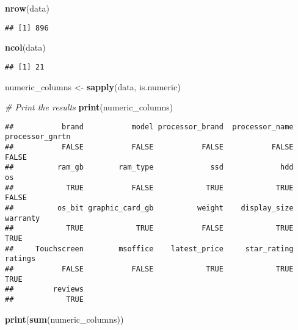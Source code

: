 \documentclass[
]{article}
\newenvironment{Shaded}{\begin{snugshade}}{\end{snugshade}}
\newcommand{\CommentTok}[1]{\textcolor[rgb]{0.56,0.35,0.01}{\textit{#1}}}
\newcommand{\FunctionTok}[1]{\textcolor[rgb]{0.13,0.29,0.53}{\textbf{#1}}}
\newcommand{\NormalTok}[1]{#1}
\newcommand{\OtherTok}[1]{\textcolor[rgb]{0.56,0.35,0.01}{#1}}
\begin{document}
\begin{Shaded}
\begin{Highlighting}[]
\FunctionTok{nrow}\NormalTok{(data)}
\end{Highlighting}
\end{Shaded}

\begin{verbatim}
## [1] 896
\end{verbatim}

\begin{Shaded}
\begin{Highlighting}[]
\FunctionTok{ncol}\NormalTok{(data)}
\end{Highlighting}
\end{Shaded}

\begin{verbatim}
## [1] 21
\end{verbatim}

\begin{Shaded}
\begin{Highlighting}[]
\NormalTok{numeric\_columns }\OtherTok{\textless{}{-}} \FunctionTok{sapply}\NormalTok{(data, is.numeric)}

\CommentTok{\# Print the results}
\FunctionTok{print}\NormalTok{(numeric\_columns)}
\end{Highlighting}
\end{Shaded}

\begin{verbatim}
##           brand           model processor_brand  processor_name processor_gnrtn 
##           FALSE           FALSE           FALSE           FALSE           FALSE 
##          ram_gb        ram_type             ssd             hdd              os 
##            TRUE           FALSE            TRUE            TRUE           FALSE 
##          os_bit graphic_card_gb          weight    display_size        warranty 
##            TRUE            TRUE           FALSE            TRUE            TRUE 
##     Touchscreen        msoffice    latest_price     star_rating         ratings 
##           FALSE           FALSE            TRUE            TRUE            TRUE 
##         reviews 
##            TRUE
\end{verbatim}

\begin{Shaded}
\begin{Highlighting}[]
\FunctionTok{print}\NormalTok{(}\FunctionTok{sum}\NormalTok{(numeric\_columns))}
\end{Highlighting}
\end{Shaded}
\end{document}
